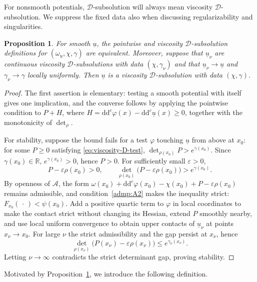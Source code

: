 \documentclass[oneside,english,letterpaper]{amsart}
\numberwithin{equation}{section}
\theoremstyle{plain}
\newtheorem{prop}[thm]{Proposition}
\theoremstyle{definition}
\theoremstyle{remark}
\renewcommand{\d}{\mathrm{d}}
\newcommand{\ddc}{\d\d^c}
\begin{document}
For nonsmooth potentials, $\mathcal D$-subsolution will always
mean viscosity $\mathcal D$-subsolution.  We suppress the fixed data also when discussing
regularizability and singularities.

\begin{prop}
	\label{prop:D-consistency-stability}
	For smooth $\underline u$, the pointwise and viscosity
	$\mathcal D$-subsolution definitions for
	$(\omega_{\underline u},\chi,\gamma)$ are equivalent.
	Moreover, suppose that $\underline u_\nu$ are continuous viscosity
	$\mathcal D$-subsolutions with data $(\chi,\gamma_\nu)$ and that
	$\underline u_\nu\to\underline u$ and $\gamma_\nu\to\gamma$
	locally uniformly. Then $\underline u$ is a viscosity
	$\mathcal D$-subsolution with data $(\chi,\gamma)$.
\end{prop}

\begin{proof}
	The first assertion is elementary: testing a smooth potential with
	itself gives one implication, and the converse follows by applying
	the pointwise condition to $P+H$, where
	$H=\ddc\varphi(x)-\ddc\underline u(x)\ge0$, together with the
	monotonicity of $\det_\rho$.
	
	For stability, suppose the bound fails for a test $\varphi$ touching
	$\underline u$ from above at $x_0$: for some $P\geq0$ satisfying
	\eqref{eq:viscosity-D-test},
	$\det_{\rho(x_0)}P>e^{\gamma(x_0)}$. Since $\gamma(x_0)\in\mathbb R$,
	$e^{\gamma(x_0)}>0$, hence $P>0$. For sufficiently small
	$\varepsilon>0$,
	$$
	P-\varepsilon\rho(x_0)>0,\qquad
	\det_{\rho(x_0)}\bigl(P-\varepsilon\rho(x_0)\bigr)>e^{\gamma(x_0)}.
	$$
	By openness of $\mathcal A$, the form
	$\omega(x_0)+\ddc\varphi(x_0)-\chi(x_0)+P-\varepsilon\rho(x_0)$
	remains admissible, and condition~\ref{admp:A2} makes the inequality
	strict: $F_{x_0}(\,\cdot\,)<\psi(x_0)$. Add a positive quartic term
	to $\varphi$ in local coordinates to make the contact strict
	without changing its Hessian, extend $P$ smoothly nearby, and use
	local uniform convergence to obtain upper contacts of
	$\underline u_\nu$ at points $x_\nu\to x_0$. For large $\nu$ the
	strict admissibility and the gap persist at $x_\nu$, hence
	$$
	\det_{\rho(x_\nu)}\bigl(P(x_\nu)-\varepsilon\rho(x_\nu)\bigr)
	\leq e^{\gamma_\nu(x_\nu)}.
	$$
	Letting $\nu\to\infty$ contradicts the strict determinant gap,
	proving stability.
\end{proof}

Motivated by Proposition~\ref{prop:D-consistency-stability}, we
introduce the following definition.
\end{document}
